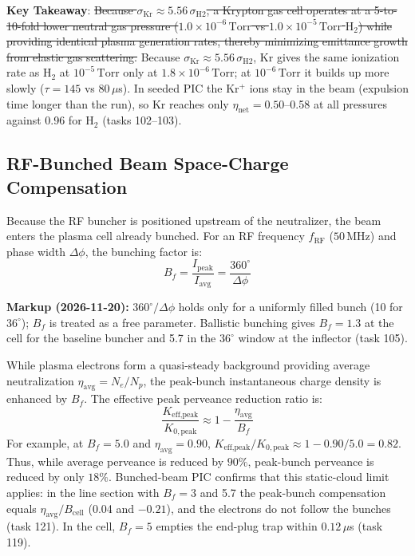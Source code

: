 \documentclass[11pt,a4paper]{article}
\newcommand{\old}[1]{\textcolor{red!70!black}{\sout{#1}}}
\newcommand{\new}[1]{\textcolor{blue!60!black}{#1}}
\newcommand{\revnote}[1]{\begin{tcolorbox}[colback=yellow!8,colframe=orange!70!black,boxrule=0.5pt,left=4pt,right=4pt,top=2pt,bottom=2pt]\small\textbf{Markup (2026-11-20):} #1\end{tcolorbox}}
\begin{document}
\textbf{Key Takeaway}: \old{Because $\sigma_{\text{Kr}} \approx 5.56 \, \sigma_{\text{H2}}$, a Krypton gas cell operates at a 5-to-10-fold lower neutral gas pressure ($1.0 \times 10^{-6}\,\text{Torr}$ vs $1.0 \times 10^{-5}\,\text{Torr}$ $\text{H}_2$) while providing identical plasma generation rates, thereby minimizing emittance growth from elastic gas scattering.} \new{Because $\sigma_{\text{Kr}} \approx 5.56 \, \sigma_{\text{H2}}$, Kr gives the same ionization rate as $\text{H}_2$ at $10^{-5}\,\text{Torr}$ only at $1.8\times10^{-6}\,\text{Torr}$; at $10^{-6}\,\text{Torr}$ it builds up more slowly ($\tau = 145$ vs $80\,\mu$s). In seeded PIC the Kr$^+$ ions stay in the beam (expulsion time longer than the run), so Kr reaches only $\eta_{\text{net}} = 0.50$--0.58 at all pressures against 0.96 for $\text{H}_2$ (tasks 102--103).}

\subsection{RF-Bunched Beam Space-Charge Compensation}
Because the RF buncher is positioned upstream of the neutralizer, the beam enters the plasma cell already bunched. For an RF frequency $f_{\text{RF}}$ ($50\,\text{MHz}$) and phase width $\Delta \phi$, the bunching factor is:
\begin{equation}
B_f = \frac{I_{\text{peak}}}{I_{\text{avg}}} = \frac{360^\circ}{\Delta \phi}
\end{equation}
\revnote{$360^\circ/\Delta\phi$ holds only for a uniformly filled bunch (10 for $36^\circ$);
$B_f$ is treated as a free parameter. Ballistic bunching gives $B_f = 1.3$ at the cell for the
baseline buncher and 5.7 in the $36^\circ$ window at the inflector (task 105).}
While plasma electrons form a quasi-steady background providing average neutralization $\eta_{\text{avg}} = N_e / N_p$, the peak-bunch instantaneous charge density is enhanced by $B_f$. The effective peak perveance reduction ratio is:
\begin{equation}
\frac{K_{\text{eff,peak}}}{K_{0,\text{peak}}} \approx 1 - \frac{\eta_{\text{avg}}}{B_f}
\end{equation}
For example, at $B_f = 5.0$ and $\eta_{\text{avg}} = 0.90$, $K_{\text{eff,peak}} / K_{0,\text{peak}} \approx 1 - 0.90/5.0 = 0.82$. Thus, while average perveance is reduced by $90\%$, peak-bunch perveance is reduced by only $18\%$.
\new{Bunched-beam PIC confirms that this static-cloud limit applies: in the line section with
$B_f = 3$ and 5.7 the peak-bunch compensation equals $\eta_{\text{avg}}/B_{\text{cell}}$
(0.04 and $-0.21$), and the electrons do not follow the bunches (task 121). In the cell, $B_f = 5$
empties the end-plug trap within $0.12\,\mu$s (task 119).}
\end{document}
